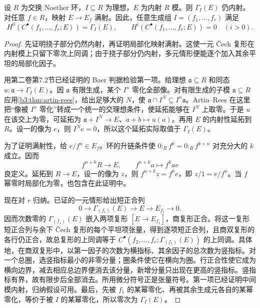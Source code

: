 \begin{lemma}\label{b3:lem:injective-cech-acyclic}
	设 \(R\) 为交换 Noether 环，\(I\subseteq R\) 为理想，\(E\) 为内射 \(R\) 模。则 \(\Gamma_I(E)\) 仍内射。对任意 \(f\in R\)，映射 \(E\to E_f\) 满射。因此，任意生成组 \(I=(f_1,\ldots,f_r)\) 满足
	\[
		H^0(C^\bullet(f_1,\ldots,f_r;E))=\Gamma_I(E),\qquad H^i(C^\bullet(f_1,\ldots,f_r;E))=0\quad(i>0).
	\]
\end{lemma}
\begin{proof}
	先证明挠子部分仍然内射，再证明局部化映射满射。这使一元 Čech 复形在内射模上只留下零次上同调；由于挠子部分仍内射，多元情形便能逐个加入其余平坦的局部化因子。

	用第二卷第7.2节已经证明的 Baer 判据检验第一项。给理想 \(\mathfrak a\subseteq R\) 和同态 \(u:\mathfrak a\to\Gamma_I(E)\)。因 \(\mathfrak a\) 有限生成，某个 \(I^n\) 零化全部像。对有限生成的子模 \(\mathfrak a\subseteq R\) 应用\cref{b3:thm:artin-rees}，给出足够大的 \(N\)，使 \(\mathfrak a\cap I^N\subseteq I^n\mathfrak a\)。Artin–Rees 在这里把“像被 \(I^n\) 零化”转成一个统一的交理想条件，使延拓能够在 \(I^N\) 上取零。于是 \(u\) 在该交上为零，可延拓为 \(\mathfrak a+I^N\to E\)、\(a+b\mapsto u(a)\)。再用 \(E\) 的内射性延拓到 \(R\)。设一的像为 \(e\)，则 \(I^Ne=0\)，所以这个延拓实际取值于 \(\Gamma_I(E)\)。

	为了证明满射性，给 \(e/f^n\in E_f\)。环的升链条件使 \(0:_Rf^k=0:_Rf^{k+n}\) 对充分大的 \(k\) 成立。因而
	\[
		f^{n+k}R\longrightarrow E,\qquad f^{n+k}a\longmapsto f^kae
	\]
	良定义。延拓到 \(R\to E\)，设一的像为 \(z\)，则 \(f^{n+k}z=f^ke\)，即 \(z/1=e/f^n\)。当 \(f\) 幂零时局部化为零，也包含在此证明中。

	现在对 \(r\) 归纳。已证的一元情形给出短正合列
	\[
		0\longrightarrow\Gamma_{(f_1)}(E)\longrightarrow E\longrightarrow E_{f_1}\longrightarrow0.
	\]
	因而次数零的 \(\Gamma_{(f_1)}(E)\) 嵌入两项复形 \([E\to E_{f_1}]\)，商复形正合。将这一复形短正合列与余下 Čech 复形的每个平坦项张量，得到逐项短正合列，且商双复形的各行仍正合，故总复形的上同调等于 \(C^\bullet(f_2,\ldots,f_r;\Gamma_{(f_1)}(E))\) 的上同调。具体地，在商双复形中，以第一因子的次数为横指标、其余因子的总次数为竖指标。对一个总圈，选竖指标最小的非零分量；圈条件使它在横向为圈。行正合性使它成为横向边界，减去相应总边界便消去该分量，新增分量只出现在更高的竖指标。竖指标有界，故有限步后全部消去。所用微分符号正是张量符号。第一项已经证明中间模内射，归纳假设可用。最后，先被 \(f_1\) 的某幂零化、再被其余生成元各自的某幂零化，等价于被 \(I\) 的某幂零化，所以零次为 \(\Gamma_I(E)\)。
\end{proof}

